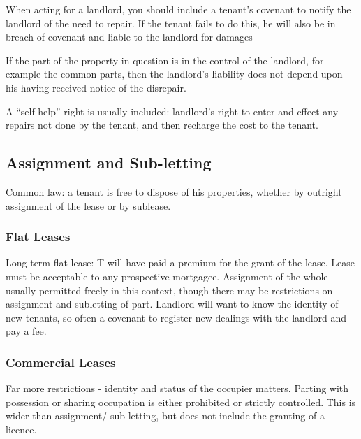 \documentclass[
]{article}
\newenvironment{Shaded}{}{}
\newcommand{\NormalTok}[1]{#1}
\begin{document}
\begin{Shaded}
\begin{Highlighting}[]
\NormalTok{When acting for a landlord, you should include a tenant’s covenant to notify the landlord of the need to repair. If the tenant fails to do this, he will also be in breach of covenant and liable to the landlord for damages}
\end{Highlighting}
\end{Shaded}

If the part of the property in question is in the control of the
landlord, for example the common parts, then the landlord's liability
does not depend upon his having received notice of the disrepair.

A ``self-help'' right is usually included: landlord's right to enter and
effect any repairs not done by the tenant, and then recharge the cost to
the tenant.

\hypertarget{assignment-and-sub-letting}{%
\subsection{Assignment and
Sub-letting}\label{assignment-and-sub-letting}}

Common law: a tenant is free to dispose of his properties, whether by
outright assignment of the lease or by sublease.

\hypertarget{flat-leases}{%
\subsubsection{Flat Leases}\label{flat-leases}}

Long-term flat lease: T will have paid a premium for the grant of the
lease. Lease must be acceptable to any prospective mortgagee. Assignment
of the whole usually permitted freely in this context, though there may
be restrictions on assignment and subletting of part. Landlord will want
to know the identity of new tenants, so often a covenant to register new
dealings with the landlord and pay a fee.

\hypertarget{commercial-leases-1}{%
\subsubsection{Commercial Leases}\label{commercial-leases-1}}

Far more restrictions - identity and status of the occupier matters.
Parting with possession or sharing occupation is either prohibited or
strictly controlled. This is wider than assignment/ sub-letting, but
does not include the granting of a licence.
\end{document}
